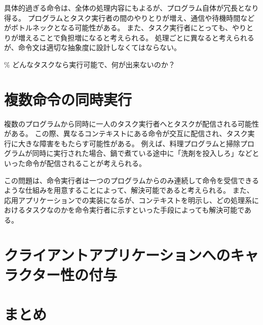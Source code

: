 具体的過ぎる命令は、全体の処理内容にもよるが、プログラム自体が冗長となり得る。
プログラムとタスク実行者の間のやりとりが増え、通信や待機時間などがボトルネックとなる可能性がある。
また、タスク実行者にとっても、やりとりが増えることで負担増になると考えられる。
処理ごとに異なると考えられるが、命令文は適切な抽象度に設計しなくてはならない。

\% どんなタスクなら実行可能で、何が出来ないのか？

\section{複数命令の同時実行}\label{ux8907ux6570ux547dux4ee4ux306eux540cux6642ux5b9fux884c}

複数のプログラムから同時に一人のタスク実行者へとタスクが配信される可能性がある。
この際、異なるコンテキストにある命令が交互に配信され、タスク実行に大きな障害をもたらす可能性がある。
例えば、料理プログラムと掃除プログラムが同時に実行された場合、鍋で煮ている途中に「洗剤を投入しろ」などといった命令が配信されることが考えられる。

この問題は、命令実行者は一つのプログラムからのみ連続して命令を受信できるような仕組みを用意することによって、解決可能であると考えられる。
また、応用アプリケーションでの実装になるが、コンテキストを明示し、どの処理系におけるタスクなのかを命令実行者に示すといった手段によっても解決可能である。

\section{クライアントアプリケーションへのキャラクター性の付与}\label{ux30afux30e9ux30a4ux30a2ux30f3ux30c8ux30a2ux30d7ux30eaux30b1ux30fcux30b7ux30e7ux30f3ux3078ux306eux30adux30e3ux30e9ux30afux30bfux30fcux6027ux306eux4ed8ux4e0e}

\section{まとめ}\label{ux307eux3068ux3081}
